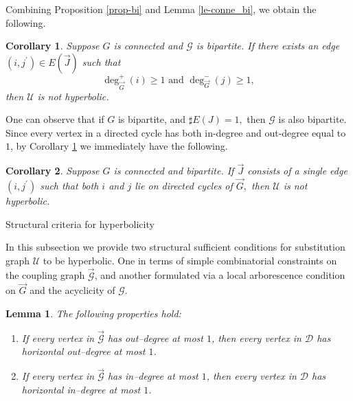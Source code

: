 \documentclass[reqno]{amsart}
\makeatletter
\theoremstyle{plain}
\newtheorem{corollary}{Corollary}
\newtheorem{lemma}{Lemma}
\numberwithin{equation}{section}
\renewcommand{\subsection}{\@startsection{subsection}{2}  \z@{.5\linespacing\@plus.7\linespacing}{.5\linespacing}  {\normalfont\bfseries}}
\makeatother
\begin{document}
Combining Proposition \ref{prop-bi} and Lemma \ref{le-conne_bi}, we obtain
the following.

\begin{corollary}
\label{coro-nonhyper}Suppose $G$ is connected and $\mathcal{G}$ is
bipartite. If there exists an edge $(i,j^{\prime })\in E(\overrightarrow{J})$
such that%
\begin{equation*}
\deg _{\overrightarrow{G}}^{+}(i)\geq 1\text{ and }\deg _{\overrightarrow{G}%
}^{-}(j)\geq 1,
\end{equation*}%
then $\mathcal{U}$ is not hyperbolic.
\end{corollary}

One can observe that if $G$ is bipartite, and $\sharp E(J)=1,$ then $%
\mathcal{G}$ is also bipartite. Since every vertex in a directed cycle has
both in-degree and out-degree equal to $1$, by Corollary \ref{coro-nonhyper}
we immediately have the following.

\begin{corollary}
\label{coro-cycle}Suppose $G$ is connected and bipartite. If $%
\overrightarrow{J}$ consists of a single edge $(i,j^{\prime })$ such that
both $i$ and $j$ lie on directed cycles of $\overrightarrow{G},$ then $%
\mathcal{U}$ is not hyperbolic.
\end{corollary}

\bigskip

\subsection{Structural criteria for hyperbolicity}

In this subsection we provide two structural sufficient conditions for
substitution graph $\mathcal{U}$ to be hyperbolic. One in terms of simple
combinatorial constraints on the coupling graph $\overrightarrow{\mathcal{G}}
$, and another formulated via a local arborescence condition on $%
\overrightarrow{G}$ and the acyclicity of $\mathcal{G}.$

\begin{lemma}
\label{le-<=1}The following properties hold:

\begin{enumerate}
\item[(i)] If every vertex in $\overrightarrow{\mathcal{G}}$ has out--degree
at most $1$, then every vertex in $\mathcal{D}$ has horizontal out--degree
at most $1$.

\item[(ii)] If every vertex in $\overrightarrow{\mathcal{G}}$ has in--degree
at most $1$, then every vertex in $\mathcal{D}$ has horizontal in--degree at
most $1$.
\end{enumerate}
\end{lemma}
\end{document}
